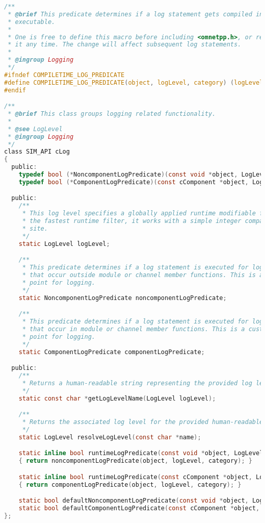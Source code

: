 \begin{lstlisting}[language=c]
/**
 * @brief This predicate determines if a log statement gets compiled into the
 * executable.
 *
 * One is free to define this macro before including <omnetpp.h>, or redefine
 * it any time. The change will affect subsequent log statements.
 *
 * @ingroup Logging
 */
#ifndef COMPILETIME_LOG_PREDICATE
#define COMPILETIME_LOG_PREDICATE(object, logLevel, category) (logLevel >= COMPILETIME_LOGLEVEL)
#endif

/**
 * @brief This class groups logging related functionality.
 *
 * @see LogLevel
 * @ingroup Logging
 */
class SIM_API cLog
{
  public:
    typedef bool (*NoncomponentLogPredicate)(const void *object, LogLevel logLevel, const char *category);
    typedef bool (*ComponentLogPredicate)(const cComponent *object, LogLevel logLevel, const char *category);

  public:
    /**
     * This log level specifies a globally applied runtime modifiable filter. This is
     * the fastest runtime filter, it works with a simple integer comparison at the call
     * site.
     */
    static LogLevel logLevel;

    /**
     * This predicate determines if a log statement is executed for log statements
     * that occur outside module or channel member functions. This is a customization
     * point for logging.
     */
    static NoncomponentLogPredicate noncomponentLogPredicate;

    /**
     * This predicate determines if a log statement is executed for log statements
     * that occur in module or channel member functions. This is a customization
     * point for logging.
     */
    static ComponentLogPredicate componentLogPredicate;

  public:
    /**
     * Returns a human-readable string representing the provided log level.
     */
    static const char *getLogLevelName(LogLevel logLevel);

    /**
     * Returns the associated log level for the provided human-readable string.
     */
    static LogLevel resolveLogLevel(const char *name);

    static inline bool runtimeLogPredicate(const void *object, LogLevel logLevel, const char *category)
    { return noncomponentLogPredicate(object, logLevel, category); }

    static inline bool runtimeLogPredicate(const cComponent *object, LogLevel logLevel, const char *category)
    { return componentLogPredicate(object, logLevel, category); }

    static bool defaultNoncomponentLogPredicate(const void *object, LogLevel logLevel, const char *category);
    static bool defaultComponentLogPredicate(const cComponent *object, LogLevel logLevel, const char *category);
};


\end{lstlisting}
